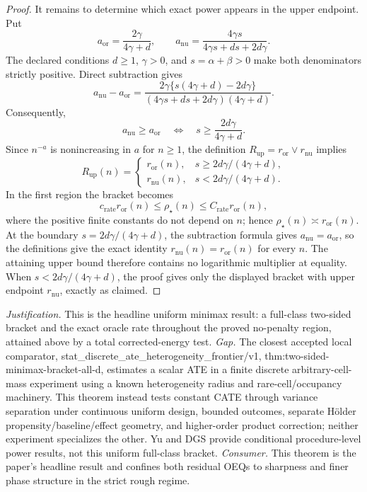 \documentclass{article}
\begin{document}
\begin{proof}
It remains to determine which exact power appears in the upper endpoint.  Put
\[
 a_{\mathrm{or}}=\frac{2\gamma}{4\gamma+d},
 \qquad
 a_{\mathrm{nu}}=\frac{4\gamma s}{4\gamma s+ds+2d\gamma}.
\]
The declared conditions \(d\ge1\), \(\gamma>0\), and \(s=\alpha+\beta>0\) make both denominators strictly positive.  Direct subtraction gives
\[
 a_{\mathrm{nu}}-a_{\mathrm{or}}
 =\frac{2\gamma\{s(4\gamma+d)-2d\gamma\}}
 {(4\gamma s+ds+2d\gamma)(4\gamma+d)}.
\]
Consequently,
\[
 a_{\mathrm{nu}}\ge a_{\mathrm{or}}
 \quad\Longleftrightarrow\quad
 s\ge\frac{2d\gamma}{4\gamma+d}.
\]
Since \(n^{-a}\) is nonincreasing in \(a\) for \(n\ge1\), the definition
\(R_{\mathrm{up}}=r_{\mathrm{or}}\vee r_{\mathrm{nu}}\) implies
\[
 R_{\mathrm{up}}(n)=
 \begin{cases}
 r_{\mathrm{or}}(n),&s\ge 2d\gamma/(4\gamma+d),\\
 r_{\mathrm{nu}}(n),&s<2d\gamma/(4\gamma+d).
 \end{cases}
\]
In the first region the bracket becomes
\[
 c_{\mathrm{rate}}r_{\mathrm{or}}(n)
 \le \rho_\star(n)
 \le C_{\mathrm{rate}}r_{\mathrm{or}}(n),
\]
where the positive finite constants do not depend on \(n\); hence \(\rho_\star(n)\asymp r_{\mathrm{or}}(n)\).  At the boundary \(s=2d\gamma/(4\gamma+d)\), the subtraction formula gives \(a_{\mathrm{nu}}=a_{\mathrm{or}}\), so the definitions give the exact identity \(r_{\mathrm{nu}}(n)=r_{\mathrm{or}}(n)\) for every \(n\).  The attaining upper bound therefore contains no logarithmic multiplier at equality.  When \(s<2d\gamma/(4\gamma+d)\), the proof gives only the displayed bracket with upper endpoint \(r_{\mathrm{nu}}\), exactly as claimed.
\end{proof}
\par\smallskip\noindent \textit{Justification.} This is the headline uniform minimax result: a full-class two-sided bracket and the exact oracle rate throughout the proved no-penalty region, attained above by a total corrected-energy test. \textit{Gap.} The closest accepted local comparator, stat\_discrete\_ate\_heterogeneity\_frontier/v1, thm:two-sided-minimax-bracket-all-d, estimates a scalar ATE in a finite discrete arbitrary-cell-mass experiment using a known heterogeneity radius and rare-cell/occupancy machinery. This theorem instead tests constant CATE through variance separation under continuous uniform design, bounded outcomes, separate Hölder propensity/baseline/effect geometry, and higher-order product correction; neither experiment specializes the other. Yu and DGS provide conditional procedure-level power results, not this uniform full-class bracket. \textit{Consumer.} This theorem is the paper's headline result and confines both residual OEQs to sharpness and finer phase structure in the strict rough regime.
\end{document}
